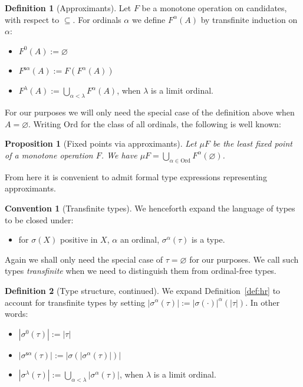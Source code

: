 \documentclass[10pt,a4paper]{amsart}
\theoremstyle{plain}
\newtheorem{proposition}[proposition]{Proposition}
\theoremstyle{definition}
\newtheorem{definition}[definition]{Definition}
\newtheorem{convention}[convention]{Convention}
\renewcommand{\emptyset}{\varnothing}
\newcommand{\dfn}{:=}
\theoremstyle{plain}
\theoremstyle{definition} %
\renewcommand{\succ}{\mathsf s}
\newcommand{\Ord}{\mathrm{Ord}}
\newcommand{\hr}[1]{|#1|}
\begin{document}
\begin{definition}
    [Approximants]
    Let $F$ be a monotone operation on candidates, with respect to $\subseteq$.
    For ordinals $\alpha$ we define $F^\alpha(A)$ by transfinite induction on $\alpha$:
    \begin{itemize}
        \item $F^0 (A) \dfn \emptyset$
        \item $F^{\succ \alpha}(A) \dfn F(F^\alpha(A))$
        \item $F^{\lambda}(A) \dfn \bigcup\limits_{\alpha<\lambda} F^\alpha(A)$, when $\lambda$ is a limit ordinal.
    \end{itemize}
\end{definition}
For our purposes we will only need the special case of the definition above when $A=\emptyset$.
Writing $\Ord$ for the class of all ordinals, the following is well known:
\begin{proposition}
    [Fixed points via approximants]
    \label{prop:fixed-points-via-approximants}
Let $\mu F$ be the least fixed point of a monotone operation $F$. 
    We have
    $\mu F = \bigcup\limits_{\alpha \in \Ord} F^\alpha(\emptyset)$.
\end{proposition}
    
From here it is convenient to admit formal type expressions representing approximants.
\begin{convention}
    [Transfinite types]
    We henceforth expand the language of types to be closed under:
\begin{itemize}
    \item for $\sigma(X)$ positive in $X$, $\alpha$ an ordinal, $\sigma^\alpha(\tau)$ is a type.
\end{itemize}
Again we shall only need the special case of $\tau = \emptyset$ for our purposes.
We call such types \emph{transfinite} when we need to distinguish them from ordinal-free types.
\end{convention}

\begin{definition}
    [Type structure, continued]
    We expand Definition~\ref{def:hr} to account for transfinite types by setting $\hr{\sigma^\alpha(\tau)} \dfn \hr{\sigma(\cdot)}^\alpha (\hr \tau)$. 
    In other words:
\begin{itemize}
    \item $\hr{\sigma^0(\tau)} := \hr\tau$
    \item $\hr{\sigma^{\succ \alpha}(\tau)}:= \hr{\sigma(\hr{\sigma^\alpha(\tau)})}$
    \item $\hr{\sigma^\lambda (\tau)}:= \bigcup\limits_{\alpha<\lambda} \hr{\sigma^\alpha(\tau)}$, when $\lambda$ is a limit ordinal.
\end{itemize}
\end{definition}
\end{document}
